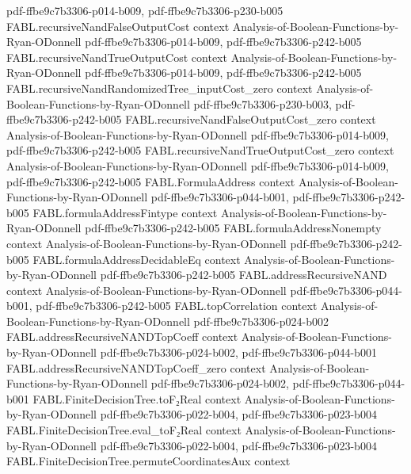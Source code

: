 \begin{theorem}
  {pdf-ffbe9c7b3306-p014-b009,
    pdf-ffbe9c7b3306-p230-b005}
\proofstep
  {FABL.recursiveNandFalseOutputCost}
  {context}
  {Analysis-of-Boolean-Functions-by-Ryan-ODonnell}
  {pdf-ffbe9c7b3306-p014-b009,
    pdf-ffbe9c7b3306-p242-b005}
\proofstep
  {FABL.recursiveNandTrueOutputCost}
  {context}
  {Analysis-of-Boolean-Functions-by-Ryan-ODonnell}
  {pdf-ffbe9c7b3306-p014-b009,
    pdf-ffbe9c7b3306-p242-b005}
\proofstep
  {FABL.recursiveNandRandomizedTree_inputCost_zero}
  {context}
  {Analysis-of-Boolean-Functions-by-Ryan-ODonnell}
  {pdf-ffbe9c7b3306-p230-b003,
    pdf-ffbe9c7b3306-p242-b005}
\proofstep
  {FABL.recursiveNandFalseOutputCost_zero}
  {context}
  {Analysis-of-Boolean-Functions-by-Ryan-ODonnell}
  {pdf-ffbe9c7b3306-p014-b009,
    pdf-ffbe9c7b3306-p242-b005}
\proofstep
  {FABL.recursiveNandTrueOutputCost_zero}
  {context}
  {Analysis-of-Boolean-Functions-by-Ryan-ODonnell}
  {pdf-ffbe9c7b3306-p014-b009,
    pdf-ffbe9c7b3306-p242-b005}
\proofstep
  {FABL.FormulaAddress}
  {context}
  {Analysis-of-Boolean-Functions-by-Ryan-ODonnell}
  {pdf-ffbe9c7b3306-p044-b001,
    pdf-ffbe9c7b3306-p242-b005}
\proofstep
  {FABL.formulaAddressFintype}
  {context}
  {Analysis-of-Boolean-Functions-by-Ryan-ODonnell}
  {pdf-ffbe9c7b3306-p242-b005}
\proofstep
  {FABL.formulaAddressNonempty}
  {context}
  {Analysis-of-Boolean-Functions-by-Ryan-ODonnell}
  {pdf-ffbe9c7b3306-p242-b005}
\proofstep
  {FABL.formulaAddressDecidableEq}
  {context}
  {Analysis-of-Boolean-Functions-by-Ryan-ODonnell}
  {pdf-ffbe9c7b3306-p242-b005}
\proofstep
  {FABL.addressRecursiveNAND}
  {context}
  {Analysis-of-Boolean-Functions-by-Ryan-ODonnell}
  {pdf-ffbe9c7b3306-p044-b001,
    pdf-ffbe9c7b3306-p242-b005}
\proofstep
  {FABL.topCorrelation}
  {context}
  {Analysis-of-Boolean-Functions-by-Ryan-ODonnell}
  {pdf-ffbe9c7b3306-p024-b002}
\proofstep
  {FABL.addressRecursiveNANDTopCoeff}
  {context}
  {Analysis-of-Boolean-Functions-by-Ryan-ODonnell}
  {pdf-ffbe9c7b3306-p024-b002,
    pdf-ffbe9c7b3306-p044-b001}
\proofstep
  {FABL.addressRecursiveNANDTopCoeff_zero}
  {context}
  {Analysis-of-Boolean-Functions-by-Ryan-ODonnell}
  {pdf-ffbe9c7b3306-p024-b002,
    pdf-ffbe9c7b3306-p044-b001}
\proofstep
  {FABL.FiniteDecisionTree.toF₂Real}
  {context}
  {Analysis-of-Boolean-Functions-by-Ryan-ODonnell}
  {pdf-ffbe9c7b3306-p022-b004,
    pdf-ffbe9c7b3306-p023-b004}
\proofstep
  {FABL.FiniteDecisionTree.eval_toF₂Real}
  {context}
  {Analysis-of-Boolean-Functions-by-Ryan-ODonnell}
  {pdf-ffbe9c7b3306-p022-b004,
    pdf-ffbe9c7b3306-p023-b004}
\proofstep
  {FABL.FiniteDecisionTree.permuteCoordinatesAux}
  {context}

\end{theorem}
